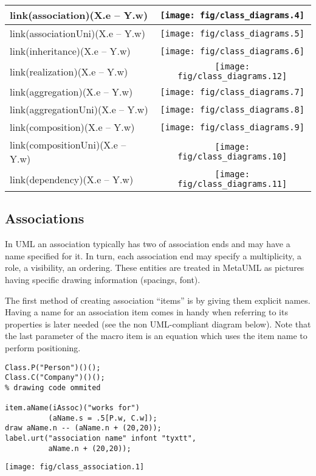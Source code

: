 \documentclass{article}
\newcommand{\code}{\ttfamily}
\begin{document}
\begin{tabular}{||l|c||}
\hline
{\code link(association)(X.e -- Y.w)} & \texttt{[image: fig/class\_diagrams.4]} \\
\hline
{\code link(associationUni)(X.e -- Y.w)} & \texttt{[image: fig/class\_diagrams.5]}  \\
\hline
{\code link(inheritance)(X.e -- Y.w)} & \texttt{[image: fig/class\_diagrams.6]} \\
\hline
{\code link(realization)(X.e -- Y.w)} & \texttt{[image: fig/class\_diagrams.12]} \\
\hline
{\code link(aggregation)(X.e -- Y.w)} & \texttt{[image: fig/class\_diagrams.7]} \\
\hline
{\code link(aggregationUni)(X.e -- Y.w)} & \texttt{[image: fig/class\_diagrams.8]} \\
\hline
{\code link(composition)(X.e -- Y.w)} & \texttt{[image: fig/class\_diagrams.9]} \\
\hline
{\code link(compositionUni)(X.e -- Y.w)} & \texttt{[image: fig/class\_diagrams.10]} \\
\hline
{\code link(dependency)(X.e -- Y.w)} & \texttt{[image: fig/class\_diagrams.11]} \\
\hline
\end{tabular}

\subsection{Associations}
In UML an association typically has two of association ends and may have a name specified for it.
In turn, each association end may specify a multiplicity, a role, a visibility, an ordering.
These entities are treated in MetaUML as pictures having specific drawing information
(spacings, font).

The first method of creating association ``items'' is by giving them explicit names.
Having a name for an association item comes in handy when referring to its properties
is later needed (see the non UML-compliant diagram below). Note that the last parameter of the macro {\code item} is an equation which uses the item name to perform positioning.

\begin{multicols}{2}
\begin{verbatim}
Class.P("Person")()();
Class.C("Company")()();
% drawing code ommited

item.aName(iAssoc)("works for")
          (aName.s = .5[P.w, C.w]);
draw aName.n -- (aName.n + (20,20));
label.urt("association name" infont "tyxtt",
          aName.n + (20,20));
\end{verbatim}
\columnbreak
\hspace{1cm}\texttt{[image: fig/class\_association.1]}
\end{multicols}
\end{document}
